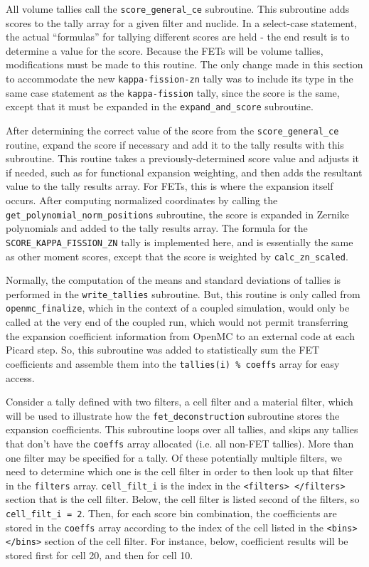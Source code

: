 \documentclass[10pt]{article}
\newcounter{subsubsubsection}[subsubsection]
\numberwithin{equation}{section} %
\begin{document}
All volume tallies call the {\tt score\_general\_ce} subroutine. This subroutine adds scores to the tally array for a given filter and nuclide. In a select-case statement, the actual ``formulas'' for tallying different scores are held - the end result is to determine a value for the score. Because the FETs will be volume tallies, modifications must be made to this routine. The only change made in this section to accommodate the new {\tt kappa-fission-zn} tally was to include its type in the same case statement as the {\tt kappa-fission} tally, since the score is the same, except that it must be expanded in the {\tt expand\_and\_score} subroutine.

After determining the correct value of the score from the {\tt score\_general\_ce} routine, expand the score if necessary and add it to the tally results with this subroutine. This routine takes a previously-determined score value and adjusts it if needed, such as for functional expansion weighting, and then adds the resultant value to the tally results array. For FETs, this is where the expansion itself occurs. After computing normalized coordinates by calling the {\tt get\_polynomial\_norm\_positions} subroutine, the score is expanded in Zernike polynomials and added to the tally results array. The formula for the {\tt SCORE\_KAPPA\_FISSION\_ZN} tally is implemented here, and is essentially the same as other moment scores, except that the score is weighted by {\tt calc\_zn\_scaled}. 
			
Normally, the computation of the means and standard deviations of tallies is performed in the {\tt write\_tallies} subroutine. But, this routine is only called from {\tt openmc\_finalize}, which in the context of a coupled simulation, would only be called at the very end of the coupled run, which would not permit transferring the expansion coefficient information from OpenMC to an external code at each Picard step. So, this subroutine was added to statistically sum the FET coefficients and assemble them into the {\tt tallies(i) \% coeffs} array for easy access. 

Consider a tally defined with two filters, a cell filter and a material filter, which will be used to illustrate how the {\tt fet\_deconstruction} subroutine stores the expansion coefficients. This subroutine loops over all tallies, and skips any tallies that don't have the {\tt coeffs} array allocated (i.e. all non-FET tallies). More than one filter may be specified for a tally. Of these potentially multiple filters, we need to determine which one is the cell filter in order to then look up that filter in the {\tt filters} array. {\tt cell\_filt\_i} is the index in the {\tt <filters> </filters>} section that is the cell filter. Below, the cell filter is listed second of the filters, so {\tt cell\_filt\_i = 2}. Then, for each score bin combination, the coefficients are stored in the {\tt coeffs} array according to the index of the cell listed in the {\tt <bins> </bins>} section of the cell filter. For instance, below, coefficient results will be stored first for cell 20, and then for cell 10.
\end{document}
